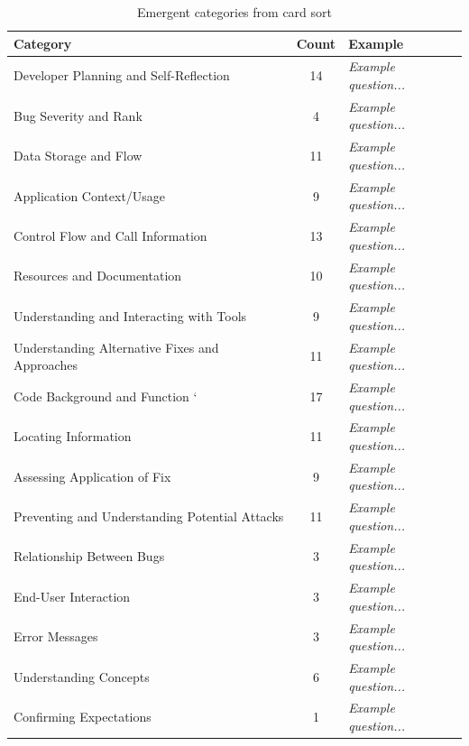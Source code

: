 \documentclass[conference]{IEEEtran}
\begin{document}
\begin{table} 
\centering
\caption{Emergent categories from card sort}
\begin{tabular}{|l|c|l|}
\rowcolor{gray!50}
\hline
    Category											& Count			& Example 	\\
    \hline		
    Developer Planning and Self-Reflection				& 14    		& \emph{Example question...}			\\
    \hline
    Bug Severity and Rank								& 4     		& \emph{Example question...}			\\
    \hline
    Data Storage and Flow								& 11     		& \emph{Example question...}		\\
    \hline
    Application Context/Usage							& 9     		& \emph{Example question...}			\\
    \hline
    Control Flow and Call Information					& 13     		& \emph{Example question...}		\\
    \hline
    Resources and Documentation							& 10     		& \emph{Example question...}			\\
    \hline
    Understanding and Interacting with Tools			& 9     		& \emph{Example question...}			\\
    \hline
    Understanding Alternative Fixes and Approaches		& 11     		& \emph{Example question...}			\\
    \hline
    Code Background and Function 	`					& 17     		& \emph{Example question...}			\\
    \hline
    Locating Information 								& 11      		& \emph{Example question...}			\\
    \hline
    Assessing Application of Fix						& 9     		& \emph{Example question...}			\\
    \hline
    Preventing and Understanding Potential Attacks		& 11     		& \emph{Example question...}			\\
    \hline
    Relationship Between Bugs							& 3     		& \emph{Example question...}			\\
    \hline
    End-User Interaction								& 3     		& \emph{Example question...}		\\
    \hline
    Error Messages										& 3     		& \emph{Example question...}			\\
    \hline
    Understanding Concepts								& 6 			& \emph{Example question...}				\\
    \hline
    Confirming Expectations					 			& 1				&  \emph{Example question...}   \\
    \hline
\end{tabular}
\label{table:categories}
\end{table}
\end{document}
